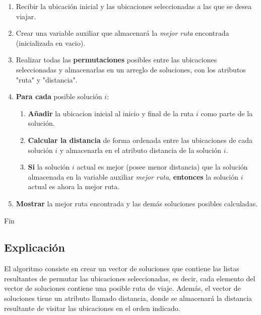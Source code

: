\documentclass[10pt]{report}
\begin{document}
\begin{enumerate}

\item Recibir la ubicación inicial y las ubicaciones seleccionadas a las que se desea viajar.

\item Crear una variable auxiliar que almacenará la \textit{mejor ruta} encontrada (inicializada en vacio).

\item Realizar todas las \textbf{permutaciones} posibles entre las ubicaciones seleccionadas y almacenarlas en un arreglo de soluciones, con los atributos "ruta" y "distancia".

\item \textbf{Para cada} posible solución $i$:
\begin{enumerate}

\item \textbf{Añadir} la ubicacion inicial al inicio y final de la ruta $i$ como parte de la solución. 

\item \textbf{Calcular la distancia} de forma ordenada entre las ubicaciones de cada solución $i$ y almacenarla en el atributo distancia de la solución $i$.

\item \textbf{Si} la solución $i$ actual es mejor (posee menor distancia) que la solución almacenada en la variable auxiliar \textit{mejor ruta}, \textbf{entonces} la solución $i$ actual es ahora la mejor ruta.

\end{enumerate}

\item \textbf{Mostrar} la mejor ruta encontrada y las demás soluciones posibles calculadas.
\end{enumerate}
Fin

\subsection*{Explicación}
El algoritmo consiste en crear un vector de soluciones que contiene las listas resultantes de permutar las ubicaciones seleccionadas, es decir, cada elemento del vector de soluciones contiene una posible ruta de viaje. Además, el vector de soluciones tiene un atributo llamado distancia, donde se almacenará la distancia resultante de visitar las ubicaciones en el orden indicado.\\
\end{document}
